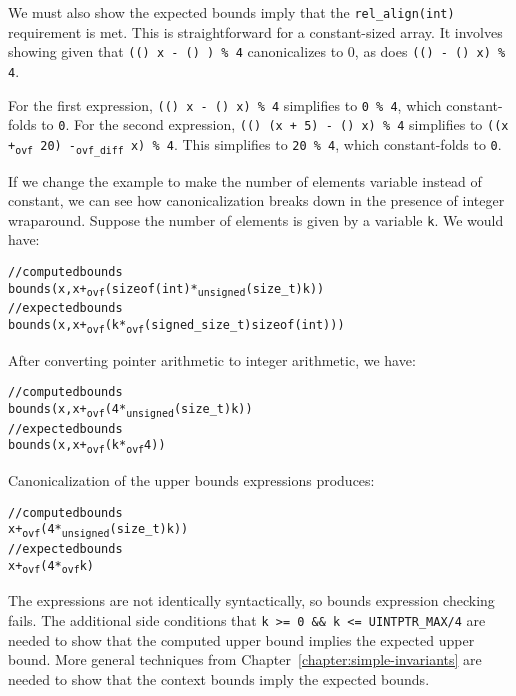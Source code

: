 We must also show the expected bounds imply that the 
\verb|rel_align(int)| requirement is met. This is straightforward for
a constant-sized array. It involves showing given 
that \texttt{((\arrayptrchar) x - (\arrayptrchar) ) \% 4} canonicalizes
to 0, as does \texttt{((\arrayptrchar)  - (\arrayptrchar) x) \% 4}.

For the first expression, \texttt{((\arrayptrchar) x - (\arrayptrchar) x) \% 4}
simplifies to \texttt{0 \% 4}, which constant-folds to \texttt{0}.
For the second expression, \texttt{((\arrayptrchar) (x + 5) - (\arrayptrchar) x) \% 4}
simplifies to \texttt{((x +\textsubscript{ovf} 20) -\textsubscript{ovf\_diff} x) \% 4}. This
simplifies to \texttt{20 \% 4}, which constant-folds to \texttt{0}.

If we change the example to make the number of elements variable instead
of constant, we can see how canonicalization breaks down in the presence
of integer wraparound. Suppose the number of elements is given by a
variable \verb|k|. We would have:

\begin{alltt}
// computed bounds
bounds(x, x +\textsubscript{ovf} (sizeof(int) *\textsubscript{unsigned} (size\_t) k))
// expected bounds
bounds(x, x +\textsubscript{ovf} (k *\textsubscript{ovf} (signed\_size\_t) sizeof(int)))
\end{alltt}

After converting pointer arithmetic to integer arithmetic, we have:
\begin{alltt}
// computed bounds
bounds(x, x +\textsubscript{ovf} (4 *\textsubscript{unsigned} (size\_t) k))
// expected bounds
bounds(x, x +\textsubscript{ovf} (k *\textsubscript{ovf} 4))
\end{alltt}

Canonicalization of the upper bounds expressions produces:
\begin{alltt}
// computed bounds
x +\textsubscript{ovf} (4 *\textsubscript{unsigned} (size\_t) k))
// expected bounds
x +\textsubscript{ovf} (4 *\textsubscript{ovf} k)
\end{alltt}

The expressions are not identically syntactically, so bounds expression
checking fails. The additional side conditions that \verb|k >= 0 && k <= UINTPTR_MAX/4|
are needed to show that the computed upper bound implies the expected upper bound. More
general techniques from Chapter~\ref{chapter:simple-invariants} are needed to show that the context
bounds imply the expected bounds.

